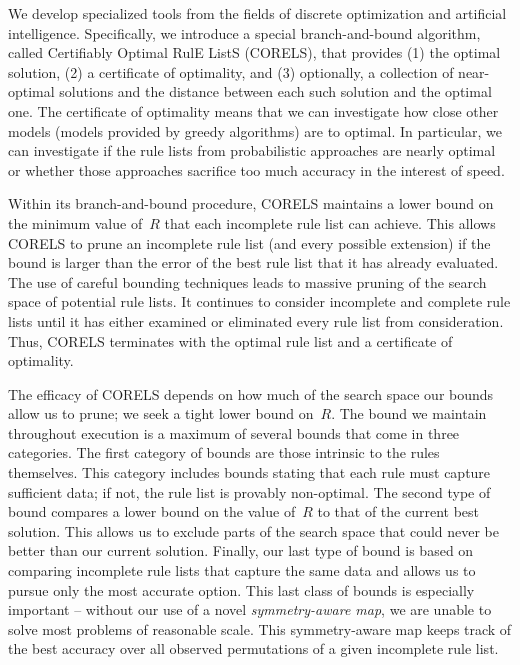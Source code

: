 We develop specialized tools from the fields of discrete optimization and artificial intelligence.
%
Specifically, we introduce a special branch-and-bound algorithm,
called Certifiably Optimal RulE ListS (CORELS), that provides
(1) the optimal solution, (2) a certificate of optimality, and (3) optionally,
a collection of near-optimal solutions and the distance between each
such solution and the optimal one.
%
The certificate of optimality means that we can investigate how close other models
(\eg models provided by greedy algorithms) are to optimal.
%
In particular, we can investigate if the rule lists from probabilistic approaches
are nearly optimal or whether those approaches sacrifice too much accuracy
in the interest of speed.

\begin{arxiv}
Within its branch-and-bound procedure, CORELS maintains a lower bound on the
minimum value of~$R$ that each incomplete rule list can achieve.
%
This allows CORELS to prune an incomplete rule list (and every possible extension)
if the bound is larger than the error of the best rule list that it has already evaluated.
%
The use of careful bounding techniques leads to massive pruning of
the search space of potential rule lists.
%
It continues to consider incomplete and complete rule lists until it has either
examined or eliminated every rule list from consideration.
%
Thus, CORELS terminates with the optimal rule list %
and a certificate of optimality.
\end{arxiv}

The efficacy of CORELS depends on how much of the search space our bounds
allow us to prune; we seek a tight lower bound on~$R$.
%
The bound we maintain throughout execution is a maximum of several bounds
that come in three categories.
%
The first category of bounds are those intrinsic to the rules themselves.
%
This category includes bounds stating that each rule must capture sufficient data;
if not, the rule list is provably non-optimal.
%
The second type of bound compares a lower bound on the value of~$R$
to that of the current best solution.
%
This allows us to exclude parts of the search space that could never be better
than our current solution.
%
Finally, our last type of bound is based on comparing incomplete rule lists that
capture the same data and allows us to pursue only the most accurate option.
%
This last class of bounds is especially important -- without our use of a novel
\textit{symmetry-aware map}, we are unable to solve most problems of reasonable scale.
%
This symmetry-aware map keeps track of the best accuracy
over all observed permutations of a given incomplete rule list.

